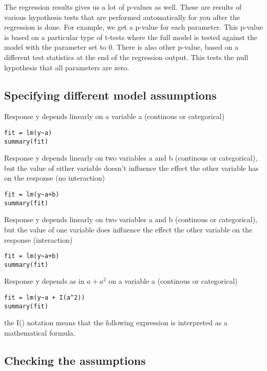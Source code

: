 \documentclass[a4paper,twoside]{tufte-book} %
\begin{document}
The regression results gives us a lot of p-values as well. These are results of various hypothesis tests that are performed automatically for you after the regression is done. For example, we get a p-value for each parameter. This p-value is based on a particular type of t-tests where the full model is tested against the model with the parameter set to 0. There is also other p-value, based on a different test statistics at the end of the regression output. This tests the null hypothesis that all parameters are zero.  

\subsection{Specifying different model assumptions}

Response y depends linearly on a variable a (continous or categorical)

\begin{lstlisting}
fit = lm(y~a)
summary(fit)
\end{lstlisting}

Response y depends linearly on two variables a and b (continous or categorical), but the value of either variable doesn't influence the effect the other variable has on the response (no interaction)

\begin{lstlisting}
fit = lm(y~a+b)
summary(fit)
\end{lstlisting}

Response y depends linearly on two variables a and b (continous or categorical), but the value of one variable does influence the effect the other variable on the response (interaction)

\begin{lstlisting}
fit = lm(y~a+b)
summary(fit)
\end{lstlisting}

Response y depends as in $a + a^2$ on a variable a (continous or categorical)

\begin{lstlisting}
fit = lm(y~a + I(a^2))
summary(fit)
\end{lstlisting}

the I() notation means that the following expression is interpreted as a mathematical formula. 



\subsection{Checking the assumptions}
\end{document}
